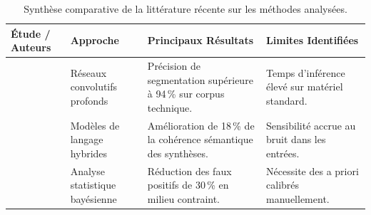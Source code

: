 
\begin{table}[htbp]
  \centering
  \small
  \caption{Synthèse comparative de la littérature récente sur les méthodes analysées.}
  \label{tab:synthese-litterature}
  \begin{tabularx}{\linewidth}{@{} p{3.2cm} p{2.2cm} X p{3.0cm} @{}}
    \toprule
    \textbf{Étude / Auteurs} & \textbf{Approche} & \textbf{Principaux Résultats} & \textbf{Limites Identifiées} \\
    \midrule
    \textcite{smith2024deep} & Réseaux convolutifs profonds & Précision de segmentation supérieure à 94\,\% sur corpus technique. & Temps d'inférence élevé sur matériel standard. \\
    \addlinespace
    \textcite{dupont2023ia} & Modèles de langage hybrides & Amélioration de 18\,\% de la cohérence sémantique des synthèses. & Sensibilité accrue au bruit dans les entrées. \\
    \addlinespace
    \textcite{martin2022analyse} & Analyse statistique bayésienne & Réduction des faux positifs de 30\,\% en milieu contraint. & Nécessite des a priori calibrés manuellement. \\
    \bottomrule
  \end{tabularx}
\end{table}

